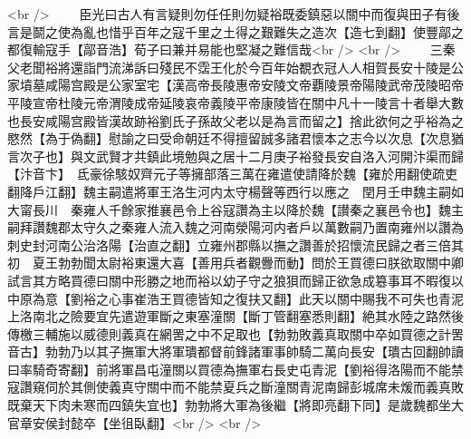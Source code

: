 <br />
　　臣光曰古人有言疑則勿任任則勿疑裕既委鎮惡以關中而復與田子有後言是鬬之使為亂也惜乎百年之寇千里之土得之艱難失之造次【造七到翻】使豐鄗之都復輸寇手【鄗音浩】荀子曰兼并易能也堅凝之難信哉<br />
<br />
　　三秦父老聞裕將還詣門流涕訴曰殘民不霑王化於今百年始覩衣冠人人相賀長安十陵是公家墳墓咸陽宫殿是公家室宅【漢高帝長陵惠帝安陵文帝覇陵景帝陽陵武帝茂陵昭帝平陵宣帝杜陵元帝渭陵成帝延陵哀帝義陵平帝康陵皆在關中凡十一陵言十者舉大數也長安咸陽宫殿皆漢故跡裕劉氏子孫故父老以是為言而留之】捨此欲何之乎裕為之愍然【為于偽翻】慰諭之曰受命朝廷不得擅留誠多諸君懷本之志今以次息【次息猶言次子也】與文武賢才共鎮此境勉與之居十二月庚子裕發長安自洛入河開汴渠而歸【汴音卞】　氐豪徐駭奴齊元子等擁部落三萬在雍遣使請降於魏【雍於用翻使疏吏翻降戶江翻】魏主嗣遣將軍王洛生河内太守楊聲等西行以應之　閏月壬申魏主嗣如大甯長川　秦雍人千餘家推襄邑令上谷寇讚為主以降於魏【讃秦之襄邑令也】魏主嗣拜讚魏郡太守久之秦雍人流入魏之河南滎陽河内者戶以萬數嗣乃置南雍州以讚為刺史封河南公治洛陽【治直之翻】立雍州郡縣以撫之讚善於招懷流民歸之者三倍其初　夏王勃勃聞太尉裕東還大喜【善用兵者觀釁而動】問於王買德曰朕欲取關中卿試言其方略買德曰關中形勝之地而裕以幼子守之狼狽而歸正欲急成簒事耳不暇復以中原為意【劉裕之心事崔浩王買德皆知之復扶又翻】此天以關中賜我不可失也青泥上洛南北之險要宜先遣遊軍斷之東塞潼關【斷丁管翻塞悉則翻】絶其水陸之路然後傳檄三輔施以威德則義真在網罟之中不足取也【勃勃敗義真取關中卒如買德之計罟音古】勃勃乃以其子撫軍大將軍璝都督前鋒諸軍事帥騎二萬向長安【璝古回翻帥讀曰率騎奇寄翻】前將軍昌屯潼關以買德為撫軍右長史屯青泥【劉裕得洛陽而不能禁寇讚窺伺於其側使義真守關中而不能禁夏兵之斷潼關青泥南歸彭城席未煖而義真敗既棄天下肉未寒而四鎮失宜也】勃勃將大軍為後繼【將即亮翻下同】是歲魏都坐大官章安侯封懿卒【坐徂臥翻】<br />
<br />
